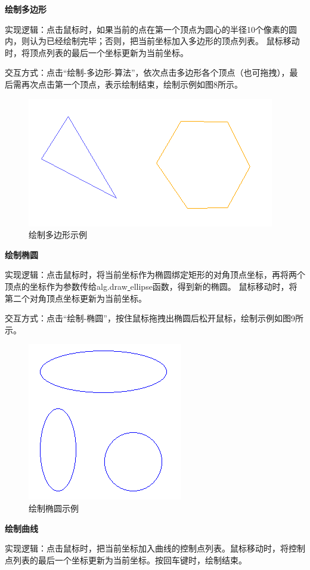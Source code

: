 \documentclass[a4paper,UTF8]{article}
\theoremstyle{definition}
\begin{document}
\textbf{绘制多边形}

实现逻辑：点击鼠标时，如果当前的点在第一个顶点为圆心的半径10个像素的圆内，则认为已经绘制完毕；否则，把当前坐标加入多边形的顶点列表。
鼠标移动时，将顶点列表的最后一个坐标更新为当前坐标。

交互方式：点击“绘制-多边形-算法”，依次点击多边形各个顶点（也可拖拽），最后需再次点击第一个顶点，表示绘制结束，绘制示例如图8所示。
\begin{figure}[H]
    \centering
    \includegraphics[scale=0.8]{draw-polygen.PNG}
    \caption{绘制多边形示例}
\end{figure}

\textbf{绘制椭圆}

实现逻辑：点击鼠标时，将当前坐标作为椭圆绑定矩形的对角顶点坐标，再将两个顶点的坐标作为参数传给alg.draw\underline{ }ellipse函数，得到新的椭圆。
鼠标移动时，将第二个对角顶点坐标更新为当前坐标。

交互方式：点击“绘制-椭圆”，按住鼠标拖拽出椭圆后松开鼠标，绘制示例如图9所示。
\begin{figure}[H]
    \centering
    \includegraphics[scale=0.8]{draw-ellipse.PNG}
    \caption{绘制椭圆示例}
\end{figure}

\textbf{绘制曲线}

实现逻辑：点击鼠标时，把当前坐标加入曲线的控制点列表。鼠标移动时，将控制点列表的最后一个坐标更新为当前坐标。按回车键时，绘制结束。
\end{document}
